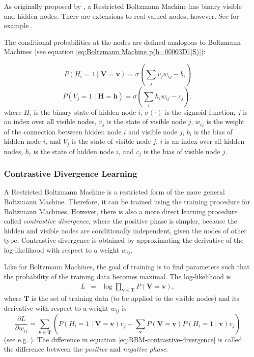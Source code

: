 As originally proposed by \cite{Smolensky1986}, a Restricted Boltzmann
Machine has binary visible and hidden nodes. There are extensions
to real-valued nodes, however. See for example \cite{FischerIgel2012}.

The conditional probabilities at the nodes are defined analogous to
Boltzmann Machines (see equation \ref{eq:Boltzmann Machine p(h=00003D1|S)}):

\[
P(H_{i}=1\mid\mathbf{V}=\mathbf{v})=\sigma\left(\sum_{j}v_{j}w_{ij}-b_{i}\right)
\]
\[
P(V_{j}=1\mid\mathbf{H}=\mathbf{h})=\sigma\left(\sum_{i}h_{i}w_{ij}-c_{j}\right),
\]
 where $H_{i}$ is the binary state of hidden node $i$, $\sigma(\cdot)$
is the sigmoid function, $j$ is an index over all visible nodes,
$v_{j}$ is the state of visible node $j$, $w_{ij}$ is the weight
of the connection between hidden node $i$ and visible node $j$,
$b_{i}$ is the bias of hidden node $i$, and $V_{j}$ is the state
of visible node $j$, $i$ is an index over all hidden nodes, $h_{i}$
is the state of hidden node $i$, and $c_{j}$ is the bias of visible
node $j$.


\subsubsection{Contrastive Divergence Learning \label{subsec:Training-Restricted-Boltzmann-Machines-using-Contrastive-Divergence}}

A Restricted Boltzmann Machine is a restricted form of the more general
Boltzmann Machine. Therefore, it can be trained using the training
procedure for Boltzmann Machines. However, there is also a more direct
learning procedure called \emph{contrastive divergence},
where the positive phase is simpler, because the hidden and visible
nodes are conditionally independent, given the nodes of other type.
Contrastive divergence is obtained by approximating the derivative
of the log-likelihood with respect to a weight $w_{ij}$.

Like for Boltzmann Machines, the goal of training is to find parameters
such that the probability of the training data becomes maximal. The
log-likelihood is 
\begin{eqnarray*}
L & = & \log\prod_{\mathbf{v}\in\mathbf{T}}P(\mathbf{V}=\mathbf{v}),
\end{eqnarray*}
 where $\mathbf{T}$ is the set of training data (to be applied to
the visible nodes) and its derivative with respect to a weight $w_{ij}$
is 
\begin{equation}
\frac{\partial L}{\partial w_{ij}}=\sum_{\mathbf{v}\in\mathbf{T}}\left(P(H_{i}=1\mid\mathbf{V=v})v_{j}-\sum_{\mathbf{v}}P(\mathbf{V=v})P(H_{i}=1\mid\mathbf{v})v_{j}\right)\label{eq:RBM-contrastive-divergence}
\end{equation}
 (see e.g. \cite{FischerIgel2012}). The difference in equation \ref{eq:RBM-contrastive-divergence}
is called the difference between the \emph{positive
}and \emph{negative phase}.

